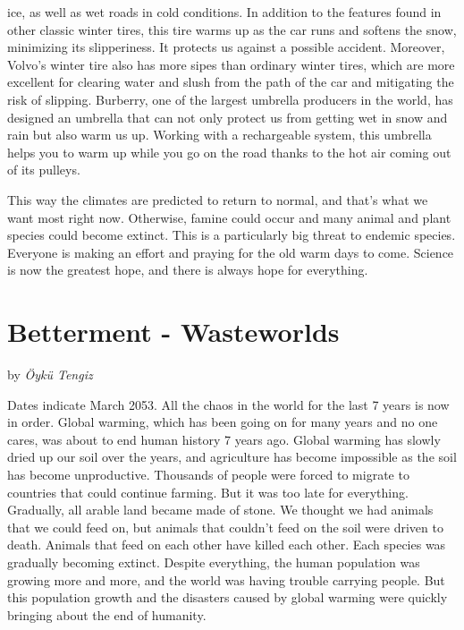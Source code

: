 \documentclass[]{book}
\begin{document}
ice, as well as wet roads in cold conditions. In addition to the features found in other classic winter tires, this tire warms up as the car runs and softens the snow, minimizing its slipperiness. It protects us against a possible accident. Moreover, Volvo's winter tire also has more sipes than ordinary winter tires, which are more excellent for clearing water and slush from the path of the car and mitigating the risk of slipping. Burberry, one of the largest umbrella producers in the world, has designed an umbrella that can not only protect us from getting wet in snow and rain but also warm us up. Working with a rechargeable system, this umbrella helps you to warm up while you go on the road thanks to the hot air coming out of its pulleys.

This way the climates are predicted to return to normal, and that's what we want most right now. Otherwise, famine could occur and many animal and plant species could become extinct. This is a particularly big threat to endemic species. Everyone is making an effort and praying for the old warm days to come. Science is now the greatest hope, and there is always hope for everything.

\hypertarget{betterment---wasteworlds}{%
\chapter{Betterment - Wasteworlds}\label{betterment---wasteworlds}}

by \emph{Öykü Tengiz}

Dates indicate March 2053. All the chaos in the world for the last 7 years is now in order. Global warming, which has been going on for many years and no one cares, was about to end human history 7 years ago. Global warming has slowly dried up our soil over the years, and agriculture has become impossible as the soil has become unproductive. Thousands of people were forced to migrate to countries that could continue farming. But it was too late for everything. Gradually, all arable land became made of stone. We thought we had animals that we could feed on, but animals that couldn't feed on the soil were driven to death. Animals that feed on each other have killed each other. Each species was gradually becoming extinct. Despite everything, the human population was growing more and more, and the world was having trouble carrying people. But this population growth and the disasters caused by global warming were quickly bringing about the end of humanity.
\end{document}
